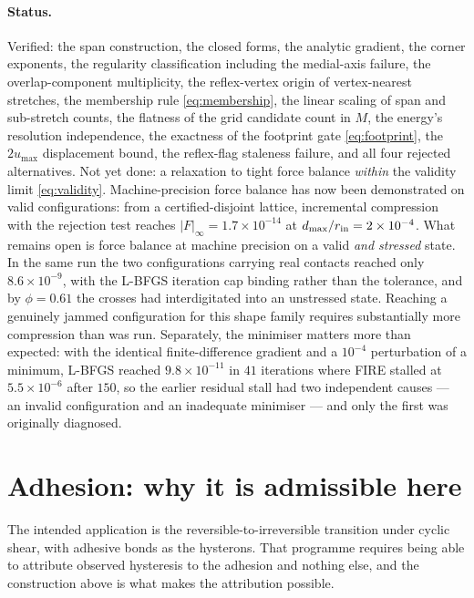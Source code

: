 \documentclass[11pt]{article}
\begin{document}
\paragraph{Status.} Verified: the span construction, the closed forms, the analytic gradient, the corner exponents, the regularity classification including the medial-axis failure, the overlap-component multiplicity, the reflex-vertex origin of vertex-nearest stretches, the membership rule \eqref{eq:membership}, the linear scaling of span and sub-stretch counts, the flatness of the grid candidate count in $M$, the energy's resolution independence, the exactness of the footprint gate \eqref{eq:footprint}, the $2u_{\max}$ displacement bound, the reflex-flag staleness failure, and all four rejected alternatives. Not yet done: a relaxation to tight force balance \emph{within} the validity limit \eqref{eq:validity}. Machine-precision force balance has now been demonstrated on valid configurations: from a certified-disjoint lattice, incremental compression with the rejection test reaches $|F|_\infty = 1.7\times10^{-14}$ at $d_{\max}/r_{\rm in} = 2\times10^{-4}$. What remains open is force balance at machine precision on a valid \emph{and stressed} state. In the same run the two configurations carrying real contacts reached only $8.6\times10^{-9}$, with the L-BFGS iteration cap binding rather than the tolerance, and by $\phi = 0.61$ the crosses had interdigitated into an unstressed state. Reaching a genuinely jammed configuration for this shape family requires substantially more compression than was run. Separately, the minimiser matters more than expected: with the identical finite-difference gradient and a $10^{-4}$ perturbation of a minimum, L-BFGS reached $9.8\times10^{-11}$ in $41$ iterations where FIRE stalled at $5.5\times10^{-6}$ after $150$, so the earlier residual stall had two independent causes --- an invalid configuration and an inadequate minimiser --- and only the first was originally diagnosed.

\section{Adhesion: why it is admissible here}
\label{sec:adhesion}

The intended application is the reversible-to-irreversible transition under cyclic shear, with adhesive bonds as the hysterons. That programme requires being able to attribute observed hysteresis to the adhesion and nothing else, and the construction above is what makes the attribution possible.
\end{document}
